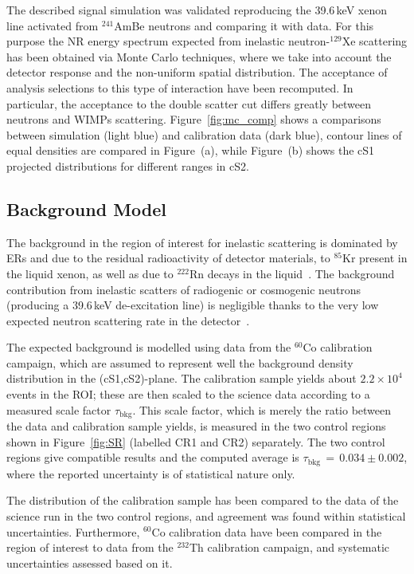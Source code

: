 {\ale  
The described signal simulation was validated reproducing the 39.6\,keV xenon line activated from $^{241}$AmBe neutrons and comparing it with data.
For this purpose the NR energy spectrum expected from inelastic neutron-$^{129}$Xe scattering has been obtained via  Monte Carlo techniques, 
where we take into account the  detector response and the non-uniform spatial distribution. The acceptance of analysis selections to this type of interaction 
have been recomputed. In particular, the acceptance to the double scatter cut differs greatly between neutrons and WIMPs scattering. 
Figure~\ref{fig:mc_comp} shows a comparisons between simulation (light blue) and calibration data (dark blue), contour lines of equal densities are compared in Figure~(a), 
while Figure~(b) shows the cS1 projected distributions for different ranges in cS2. 
}
% 



\subsection {Background Model}

The background in the region of interest for inelastic scattering is dominated by ERs and due to the residual radioactivity of detector materials, to $^{85}$Kr present in the liquid xenon, as well as due to $^{222}$Rn decays in the liquid~\cite{Aprile:2011vb}. The background contribution from inelastic scatters of radiogenic or cosmogenic neutrons (producing a 39.6\,keV de-excitation line) is negligible thanks to the very low expected neutron scattering rate in the detector~\cite{Aprile:2013tov}.


The expected background is modelled using data from the $^{60}$Co calibration campaign, which are assumed to represent well the background density distribution 
in the (cS1,cS2)-plane. The calibration sample yields  about $2.2\times10^4$ events in the ROI; these are then scaled to the science data according to a measured scale 
factor $\tau_{\text{bkg}}$. This scale factor, which is merely the ratio between the data and calibration sample yields, is measured in the two control regions shown in Figure~\ref{fig:SR} (labelled CR1 and CR2) separately. The two control regions give compatible results and the computed average is $\tau_{\text{bkg}} \, =  \, 0.034 \pm 0.002 $, where the reported uncertainty 
is of statistical nature only.

The distribution of the calibration sample has been compared to the data of the science run in the two control regions,
and agreement was found within statistical uncertainties. Furthermore, $^{60}$Co calibration data have been compared in the region of interest to  
data from the $^{232}$Th calibration campaign, and systematic uncertainties assessed based on it.

